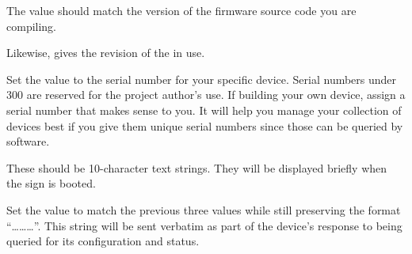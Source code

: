 
The  value should match the version of the firm\-ware source code you are compiling.

Likewise,  gives the revision of the  in use.

Set the  value to the serial number for your specific device. Serial numbers under 300 are
reserved for the project author's use. If building your own device, assign a serial number that makes sense to you.
It will help you manage your collection of devices best if you give them unique serial numbers since those can be
queried by software.

These should be 10-character text strings. They will be displayed briefly when the sign is booted.

Set the  value to match the previous three values while still preserving
the format ``\dots{}\dots{}\dots\z{\$}''. This string will be sent verbatim as part
of the device's response to being queried for its configuration and status.

%


